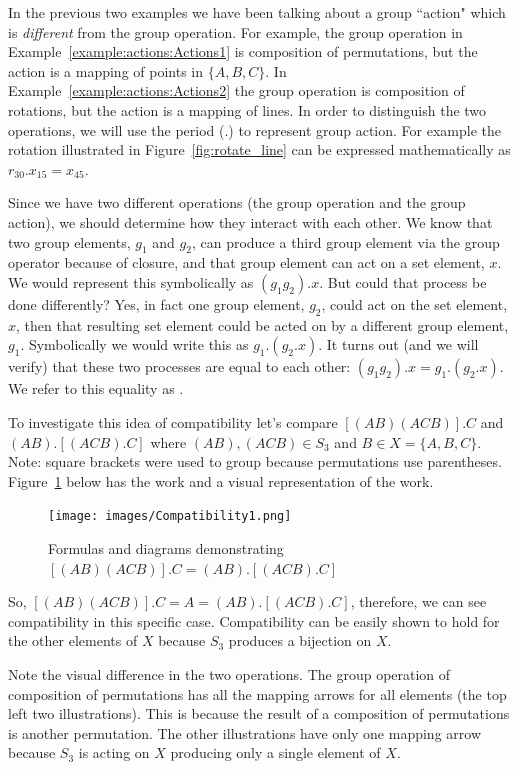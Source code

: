 In the previous two examples we have been talking about a group ``action" which is \emph{different} from the group operation.  For example, the group operation in Example~\ref{example:actions:Actions1} is composition of permutations, but the action is a mapping of points in $\{A,B,C\}$. In Example~\ref{example:actions:Actions2} the group operation is composition of rotations, but the action is a mapping of lines. In order to distinguish the two operations, we will use the period (.) to represent group action. For example the rotation illustrated in Figure~\ref{fig:rotate_line} can be expressed mathematically as $r_{30}.x_{15}=x_{45}$.

Since we have two different operations (the group operation and the group action), we should determine how they interact with each other. We know that two group elements, $g_1$ and $g_2$, can produce a third group element via the group operator because of closure, and that group element can act on a set element, $x$. We would represent this symbolically as $(g_1g_2).x$. But could that process be done differently? Yes, in fact one group element, $g_2$, could act on the set element, $x$, then that resulting set element could be acted on by a different group element, $g_1$. Symbolically we would write this as $g_1.(g_2.x)$. It turns out (and we will verify) that these two processes are equal to each other: $(g_1g_2).x=g_1.(g_2.x)$. We refer to this equality as .

\begin{example}\label{example:actions:Compat1} To investigate this idea of compatibility let's compare $[(AB)(ACB)].C$ and $(AB).[(ACB).C]$ where $(AB),(ACB) \in S_3$ and $B \in X=\{A,B,C\}$. Note: square brackets were used to group because permutations use parentheses. Figure~\ref{fig:Compatibility1} below has the work and a visual representation of the work.

\begin{figure}[htbp]
\begin{center}
\texttt{[image: images/Compatibility1.png]}
\caption{Formulas and diagrams demonstrating $[(AB)(ACB)].C=(AB).[(ACB).C]$}\label{fig:Compatibility1}
\end{center}
\end{figure}

So, $[(AB)(ACB)].C=A=(AB).[(ACB).C]$, therefore, we can see compatibility in this specific case. Compatibility can be easily shown to hold for the other elements of $X$ because $S_3$ produces a bijection on $X$.

Note the visual difference in the two operations. The group operation of composition of permutations has all the mapping arrows for all elements (the top left two illustrations). This is because the result of a composition of permutations is another permutation. The other illustrations have only one mapping arrow because $S_3$ is acting on $X$ producing only a single element of $X$.
\end{example}

